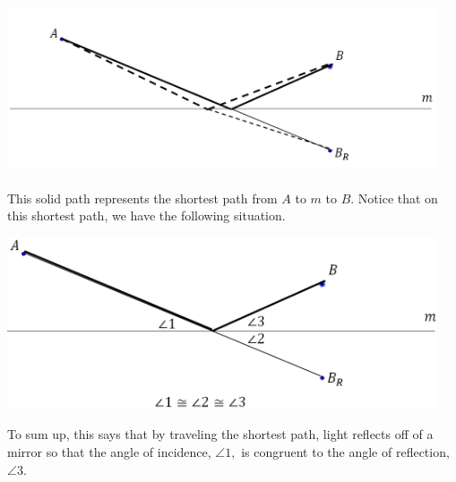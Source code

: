 \centerline{\includegraphics*[height=2in,width=5in]{Figures/ReflectingMirror3}}

This solid path represents the shortest path from $A$ to $m$ to $B.$  Notice
that on this shortest path, we have the following situation.

\centerline{\includegraphics*[height=2in,width=5in]{Figures/ReflectingMirror4}}

To sum up, this says that by traveling the shortest path, light
reflects off of a mirror so that the angle of incidence, $\angle 1,$ is
congruent to the angle of reflection, $\angle 3.$

